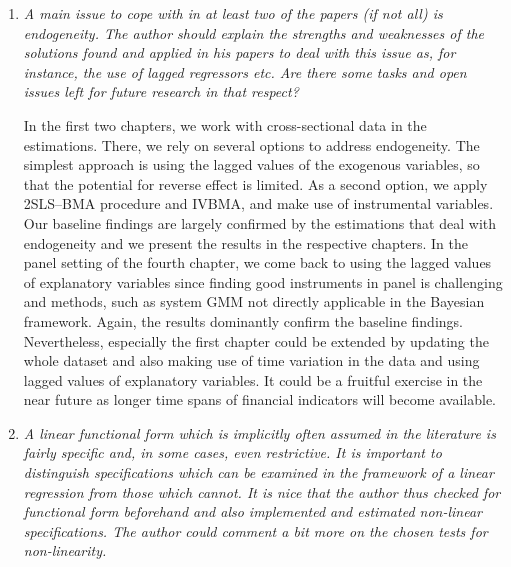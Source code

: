 


\begin{enumerate}
    \item \textit{A main issue to cope with in at least two of the papers (if not all) is endogeneity. The author should explain the strengths and weaknesses of the solutions found and applied in his papers to deal with this issue as, for instance, the use of lagged regressors etc. Are there some tasks and open issues left for future research in that respect?}
    
    In the first two chapters, we work with cross-sectional data in the estimations. There, we rely on several options to address endogeneity. The simplest approach is using the lagged values of the exogenous variables, so that the potential for reverse effect is limited. As a second option, we apply 2SLS--BMA procedure and \ac{IVBMA}, and make use of instrumental variables. Our baseline findings are largely confirmed by the estimations that deal with endogeneity and we present the results in the respective chapters. In the panel setting of the fourth chapter, we come back to using the lagged values of explanatory variables since finding good instruments in panel is challenging and methods, such as system GMM not directly applicable in the Bayesian framework. Again, the results dominantly confirm the baseline findings. Nevertheless, especially the first chapter could be extended by updating the whole dataset and also making use of time variation in the data and using lagged values of explanatory variables. It could be a fruitful exercise in the near future as longer time spans of financial indicators will become available. 

    \item \textit{A linear functional form which is implicitly often assumed in the literature is fairly specific and, in some cases, even restrictive. It is important to distinguish specifications which can be examined in the framework of a linear regression from those which cannot. It is nice that the author thus checked for functional form beforehand and also implemented and estimated non-linear specifications. The author could comment a bit more on the chosen tests for non-linearity.}
    

\end{enumerate}
